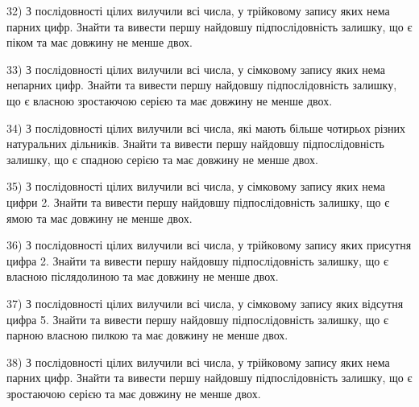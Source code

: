 \documentclass[11pt, ukrainian]{article}
\begin{document}
\par
\vspace{0.9cm}
32) \space 
З послідовності цілих вилучили всі числа, у трійковому запису яких нема парних цифр. Знайти та вивести першу найдовшу підпослідовність залишку, що є піком та має довжину не менше двох.

\par
\vspace{0.9cm}
33) \space 
З послідовності цілих вилучили всі числа, у сімковому запису яких нема непарних цифр. Знайти та вивести першу найдовшу підпослідовність залишку, що є власною зростаючою серією та має довжину не менше двох.

\par
\vspace{0.9cm}
34) \space 
З послідовності цілих вилучили всі числа, які мають більше чотирьох різних натуральних дільників. Знайти та вивести першу найдовшу підпослідовність залишку, що є спадною серією та має довжину не менше двох.

\par
\vspace{0.9cm}
35) \space 
З послідовності цілих вилучили всі числа, у сімковому запису яких нема цифри 2. Знайти та вивести першу найдовшу підпослідовність залишку, що є ямою та має довжину не менше двох.

\par
\vspace{0.9cm}
36) \space 
З послідовності цілих вилучили всі числа, у трійковому запису яких присутня цифра 2. Знайти та вивести першу найдовшу підпослідовність залишку, що є власною післядолиною та має довжину не менше двох.

\par
\vspace{0.9cm}
37) \space 
З послідовності цілих вилучили всі числа, у сімковому запису яких відсутня цифра 5. Знайти та вивести першу найдовшу підпослідовність залишку, що є парною власною пилкою та має довжину не менше двох.

\par
\vspace{0.9cm}
38) \space 
З послідовності цілих вилучили всі числа, у трійковому запису яких нема парних цифр. Знайти та вивести першу найдовшу підпослідовність залишку, що є зростаючою серією та має довжину не менше двох.
\end{document}
